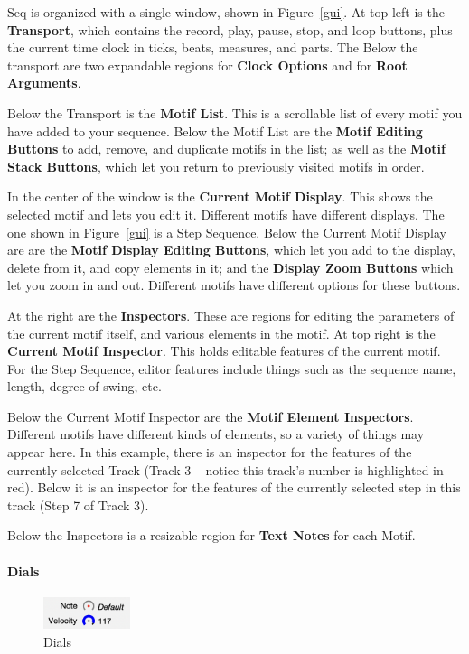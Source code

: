\documentclass[twoside,10pt]{article}
\begin{document}
Seq is organized with a single window, shown in Figure~\ref{gui}.  At top left is the {\bf Transport}, which contains the record, play, pause, stop, and loop buttons, plus the current time clock in ticks, beats, measures, and parts.  The Below the transport are two expandable regions for {\bf Clock Options} and for {\bf Root Arguments}.

Below the Transport is the {\bf Motif List}.  This is a scrollable list of every motif you have added to your sequence.  Below the Motif List are the {\bf Motif Editing Buttons} to add, remove, and duplicate motifs in the list; as well as the {\bf Motif Stack Buttons}, which let you return to previously visited motifs in order.

In the center of the window is the {\bf Current Motif Display}.  This shows the selected motif and lets you edit it.  Different motifs have different displays.  The one shown in Figure~\ref{gui} is a Step Sequence.  Below the Current Motif Display are are the {\bf Motif Display Editing Buttons}, which let you add to the display, delete from it, and copy elements in it; and the {\bf Display Zoom Buttons} which let you zoom in and out.  Different motifs have different options for these buttons.

At the right are the {\bf Inspectors}.  These are regions for editing the parameters of the current motif itself, and various elements in the motif.  At top right is the {\bf Current Motif Inspector}.  This holds editable features of the current motif.  For the Step Sequence, editor features include things such as the sequence name, length, degree of swing, etc.

Below the Current Motif Inspector are the {\bf Motif Element Inspectors}.  Different motifs have different kinds of elements, so a variety of things may appear here.  In this example, there is an inspector for the features of the currently selected Track (Track 3\,---notice this track's number is highlighted in red).  Below it is an inspector for the features of the currently selected step in this track (Step 7 of Track 3).  

Below the Inspectors is a resizable region for {\bf Text Notes} for each Motif.

\paragraph{Dials}

\begin{figure}
\includegraphics[width=1in]{smalldials}
\vspace{-2em}
\caption{Dials}
\label{dials}
\vspace{-1em}
\end{figure}
\end{document}
